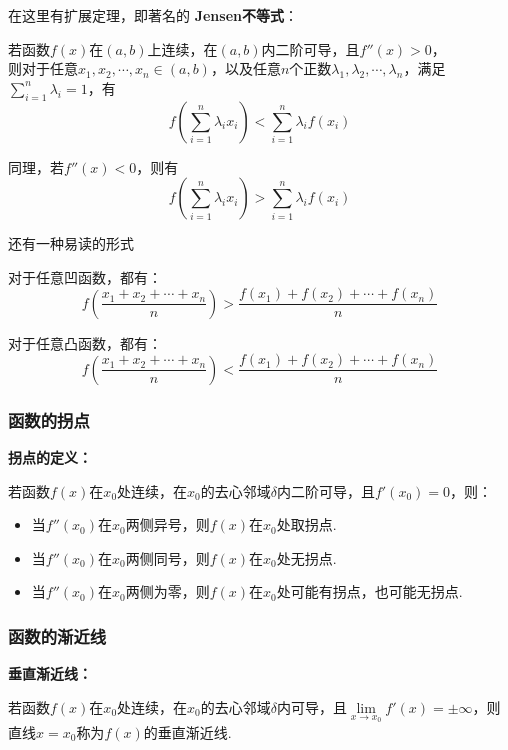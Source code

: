 \documentclass[12pt , a4paper , oneside]{ctexart}
\begin{document}
            在这里有扩展定理，即著名的 \textbf{Jensen不等式}：
            \begin{mdframed}
            若函数$f(x)$在$(a,b)$上连续，在$(a,b)$内二阶可导，且$f''(x) > 0$，\\
            则对于任意$x_1,x_2,\cdots,x_n \in (a,b)$，以及任意$n$个正数$\lambda_1,\lambda_2,\cdots,\lambda_n$，满足$\sum\limits_{i=1}^{n} \lambda_i = 1$，有
            $$f(\sum\limits_{i=1}^{n} \lambda_i x_i) < \sum\limits_{i=1}^{n} \lambda_i f(x_i)$$

            同理，若$f''(x) < 0$，则有
            $$f(\sum\limits_{i=1}^{n} \lambda_i x_i) > \sum\limits_{i=1}^{n} \lambda_i f(x_i)$$

            还有一种易读的形式
            
            对于任意凹函数，都有：
            $$f(\frac{x_1 + x_2 + \cdots + x_n}{n}) > \frac{f(x_1) + f(x_2) + \cdots + f(x_n)}{n}$$

            对于任意凸函数，都有：
            $$f(\frac{x_1 + x_2 + \cdots + x_n}{n}) < \frac{f(x_1) + f(x_2) + \cdots + f(x_n)}{n}$$

            \end{mdframed}

            \subsubsection{函数的拐点}
            \textbf{拐点的定义：}
            \begin{mdframed}
            若函数$f(x)$在$x_0$处连续，在$x_0$的去心邻域$\delta$内二阶可导，且$f'(x_0) = 0$，则：
            \begin{itemize}
                \item 当$f''(x_0)$在$x_0$两侧异号，则$f(x)$在$x_0$处取拐点.
                \item 当$f''(x_0)$在$x_0$两侧同号，则$f(x)$在$x_0$处无拐点.
                \item 当$f''(x_0)$在$x_0$两侧为零，则$f(x)$在$x_0$处可能有拐点，也可能无拐点.
            \end{itemize}
            \end{mdframed}

            \subsubsection{函数的渐近线}
            \textbf{垂直渐近线：}
            \begin{mdframed}
            若函数$f(x)$在$x_0$处连续，在$x_0$的去心邻域$\delta$内可导，且$\lim\limits_{x \to x_0} f'(x) = \pm \infty$，则直线$x = x_0$称为$f(x)$的垂直渐近线.
            \end{mdframed}
\end{document}
